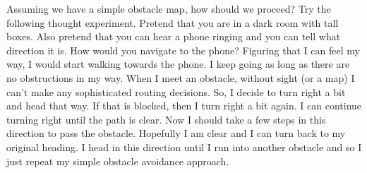 Assuming we have a simple obstacle map, how should we proceed? Try the
following thought experiment. Pretend that you are in a dark room with
tall boxes. Also pretend that you can hear a phone ringing and you can
tell what direction it is. How would you navigate to the phone? Figuring
that I can feel my way, I would start walking towards the phone. I keep
going as long as there are no obstructions in my way. When I meet an
obstacle, without sight (or a map) I can't make any sophisticated
routing decisions. So, I decide to turn right a bit and head that way.
If that is blocked, then I turn right a bit again. I can continue
turning right until the path is clear. Now I should take a few steps in
this direction to pass the obstacle. Hopefully I am clear and I can turn
back to my original heading. I head in this direction until I run into
another obstacle and so I just repeat my simple obstacle avoidance
approach.

